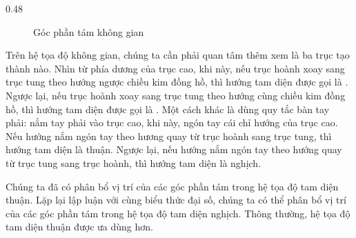 {\begin{minipageindent}{0.48\textwidth}
\begin{figure}[H]
         \caption{Góc phần tám không gian}
         \label{fig:goc phan tam khong gian}
      \end{figure}
   \end{minipageindent}
}

Trên hệ tọa độ không gian, chúng ta cần phải quan tâm thêm xem là ba trục tạo thành  nào. Nhìn từ phía dương của trục cao, khi này, nếu trục hoành xoay sang trục tung theo hướng ngược chiều kim đồng hồ, thì hướng tam diện được gọi là . Ngược lại, nếu trục hoành xoay sang trục tung theo hướng cùng chiều kim đồng hồ, thì hướng tam diện được gọi là . Một cách khác là dùng quy tắc bàn tay phải: nắm tay phải vào trục cao, khi này, ngón tay cái chỉ hướng của trục cao. Nếu hướng nắm ngón tay theo hương quay từ trục hoành sang trục tung, thì hướng tam diện là thuận. Ngược lại, nếu hướng nắm ngón tay theo hướng quay từ trục tung sang trục hoành, thì hướng tam diện là nghịch.

Chúng ta đã có phân bổ vị trí của các góc phần tám trong hệ tọa độ tam diện thuận. Lặp lại lập luận với cùng biểu thức đại số, chúng ta có thể phân bổ vị trí của các góc phần tám trong hệ tọa độ tam diện nghịch. Thông thường, hệ tọa độ tam diện thuận được ưa dùng hơn.

